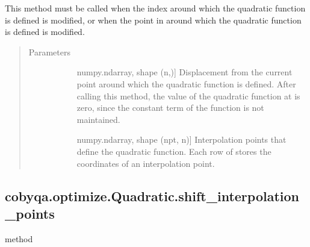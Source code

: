 \documentclass[letterpaper,10pt,english]{sphinxmanual}
\begin{document}
\begin{fulllineitems}
\begin{fulllineitems}
\sphinxAtStartPar
This method must be called when the index around which the quadratic
function is defined is modified, or when the point in  around
which the quadratic function is defined is modified.
\begin{quote}\begin{description}
\item[{Parameters}] \leavevmode\begin{description}
\item[{}] \leavevmode{[}numpy.ndarray, shape (n,){]}
\sphinxAtStartPar
Displacement from the current point  around which the
quadratic function is defined. After calling this method, the value
of the quadratic function at  is zero, since the
constant term of the function is not maintained.

\item[{}] \leavevmode{[}numpy.ndarray, shape (npt, n){]}
\sphinxAtStartPar
Interpolation points that define the quadratic function. Each row of
 stores the coordinates of an interpolation point.

\end{description}

\end{description}\end{quote}

\end{fulllineitems}



\subsection{cobyqa.optimize.Quadratic.shift\_interpolation\_points}
\label{\detokenize{refs/generated/cobyqa.optimize.Quadratic.shift_interpolation_points:cobyqa-optimize-quadratic-shift-interpolation-points}}\label{\detokenize{refs/generated/cobyqa.optimize.Quadratic.shift_interpolation_points::doc}}
\sphinxAtStartPar
method


\end{fulllineitems}
\end{document}
